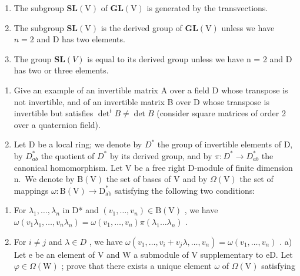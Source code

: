 \begin{enumerate}
\def\labelenumi{\alph{enumi})}
\item
  The subgroup \(\mathbf{SL}(\mathrm{V})\) of \(\mathbf{GL}(\mathrm{V})\) is generated by the transvections.
\item
  The subgroup \(\mathbf{SL}(\mathrm{V})\) is the derived group of \(\mathbf{GL}(\mathrm{V})\) unless we have \(n = 2\) and D has two elements.
\item
  The group \(\mathbf{SL}(V)\) is equal to its derived group unless we have n = 2 and D has two or three elements.
\end{enumerate}


\begin{enumerate}
\def\labelenumi{\arabic{enumi})}
\item
  Give an example of an invertible matrix A over a field D whose transpose is not invertible, and of an invertible matrix B over D whose transpose is invertible but satisfies \(\det^{t}B \neq \det B\) (consider square matrices of order 2 over a quaternion field).
\item
  Let D be a local ring; we denote by \(D^{*}\) the group of invertible elements of D, by \(D_{ab}^{*}\) the quotient of \(D^{*}\) by its derived group, and by \(\pi : D^{*} \to D_{ab}^{*}\) the canonical homomorphism. Let V be a free right D-module of finite dimension n.~We denote by \(\mathrm{B(V)}\) the set of bases of V and by \(\Omega(\mathrm{V})\) the set of mappings \(\omega : \mathrm{B(V)} \to \mathrm{D}_{\mathrm{ab}}^{*}\) satisfying the following two conditions:
\end{enumerate}

\begin{enumerate}
\def\labelenumi{(\roman{enumi})}
\item
  For \(\lambda_1, \ldots, \lambda_n\) in D* and \((v_1, \ldots, v_n) \in \mathrm{B}(\mathrm{V})\) , we have \(\omega(v_1 \lambda_1, \ldots, v_n \lambda_n) = \omega(v_1, \ldots, v_n)\pi(\lambda_1 \ldots \lambda_n)\) .
\item
  For \(i \neq j\) and \(\lambda \in D\) , we have \(\omega(v_{1},\ldots,v_{i}+v_{j}\lambda,\ldots,v_{n}) = \omega(v_{1},\ldots,v_{n})\) . a) Let e be an element of V and W a submodule of V supplementary to eD. Let \(\varphi \in \Omega(\mathrm{W})\) ; prove that there exists a unique element \(\omega\) of \(\Omega(\mathrm{V})\) satisfying
\end{enumerate}

